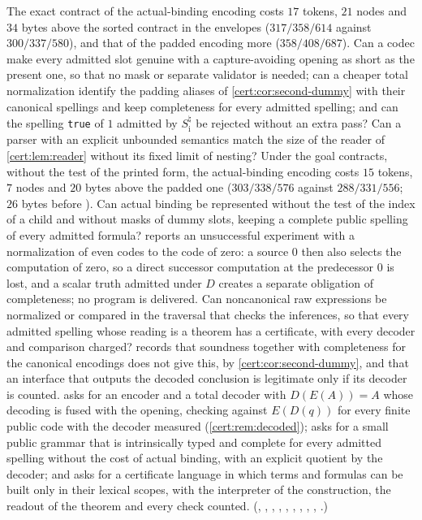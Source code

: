 \begin{question}
The exact contract of the actual-binding encoding costs $17$ tokens, $21$ nodes and $34$
bytes above the sorted contract in the envelopes ($317/358/614$ against $300/337/580$), and
that of the padded encoding more ($358/408/687$). Can a codec make every admitted slot genuine with a capture-avoiding opening as
short as the present one, so that no mask or separate validator is needed; can a cheaper
total normalization identify the padding aliases of \cref{cert:cor:second-dummy} with
their canonical spellings and keep completeness for every admitted spelling; and can the
spelling \texttt{true} of $1$ admitted by $S^{\natural}_{\mathrm i}$ be rejected without an
extra pass? Can a parser with an explicit unbounded semantics match the size of the reader
of \cref{cert:lem:reader} without its fixed limit of nesting? Under the goal contracts,
without the test of the printed form, the actual-binding encoding costs $15$ tokens, $7$ nodes and
$20$ bytes above the padded one ($303/338/576$ against $288/331/556$; $26$ bytes before
). Can actual binding be
represented without the test of the index of a child and without masks of dummy slots, keeping a
complete public spelling of every admitted formula?  reports an
unsuccessful experiment with a normalization of even codes to the code of zero: a source $0$ then
also selects the computation of zero, so a direct successor computation at the predecessor $0$ is
lost, and a scalar truth admitted under $D$ creates a separate obligation of completeness; no
program is delivered. Can noncanonical raw expressions be normalized or compared in the traversal
that checks the inferences, so that every admitted spelling whose reading is a theorem has a
certificate, with every decoder and comparison charged?  records that soundness
together with completeness for the canonical encodings does not give this, by
\cref{cert:cor:second-dummy}, and that an interface that outputs the decoded conclusion is
legitimate only if its decoder is counted.  asks for an encoder and a total
decoder with $D(E(A))=A$ whose decoding is fused with the opening, checking against $E(D(q))$ for every
finite public code with the decoder measured (\cref{cert:rem:decoded});  asks for a
small public grammar that is intrinsically typed and complete for every admitted spelling without the cost
of actual binding, with an explicit quotient by the decoder; and  asks for a certificate
language in which terms and formulas can be built only in their lexical scopes, with the interpreter of the
construction, the readout of the theorem and every check counted. (, ,
, , ,
, , , ,
.)
\end{question}

